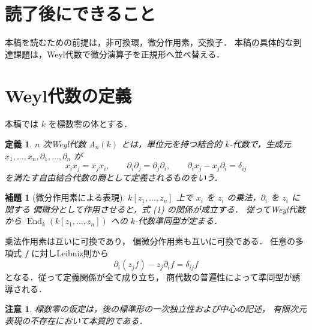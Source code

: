 \documentclass[a5paper,10pt,onecolumn]{jsarticle}
\makeatletter
\theoremstyle{mathnotetheorem}
\newtheorem{definition}[theorem]{定義}
\newtheorem{lemma}[theorem]{補題}
\newtheorem{remark}[theorem]{注意}
\renewcommand{\proofname}{証明}
\renewenvironment{proof}[1][\proofname]{%
  \par\pushQED{\qed}\normalfont\topsep4\p@\@plus2\p@\relax
  \trivlist\item[\hskip\labelsep\bfseries #1]\ignorespaces
}{\popQED\endtrivlist\@endpefalse}
\makeatother
\begin{document}
\section*{読了後にできること}
本稿を読むための前提は，非可換環，微分作用素，交換子．
本稿の具体的な到達課題は，Weyl代数で微分演算子を正規形へ並べ替える．

\section{Weyl代数の定義}
本稿では $k$ を標数零の体とする．
\begin{definition}
$n$ 次Weyl代数 $A_n(k)$ とは，単位元を持つ結合的
$k$-代数で，生成元
$x_1,\ldots,x_n,\partial_1,\ldots,\partial_n$ が
\[
 x_ix_j=x_jx_i,\qquad
 \partial_i\partial_j=\partial_j\partial_i,\qquad
 \partial_ix_j-x_j\partial_i=\delta_{ij}
 \tag{1}
\]
を満たす自由結合代数の商として定義されるものをいう．
\end{definition}
\begin{lemma}[微分作用素による表現]\label{lem:operators}
$k[z_1,\ldots,z_n]$ 上で $x_i$ を
$z_i$ の乗法，$\partial_i$ を $z_i$ に関する
偏微分として作用させると，式 (1) の関係が成立する．
従ってWeyl代数から
$\operatorname{End}_k(k[z_1,\ldots,z_n])$ への
$k$-代数準同型が定まる．
\end{lemma}
\begin{proof}
乗法作用素は互いに可換であり，
偏微分作用素も互いに可換である．
任意の多項式 $f$ に対しLeibniz則から
\[
 \partial_i(z_jf)-z_j\partial_if=\delta_{ij}f
\]
となる．従って定義関係が全て成り立ち，
商代数の普遍性によって準同型が誘導される．
\end{proof}
\begin{remark}
標数零の仮定は，後の標準形の一次独立性および中心の記述，
有限次元表現の不存在において本質的である．
\end{remark}
\end{document}

